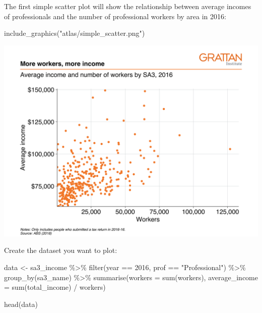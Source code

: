 \documentclass[
]{book}
\newenvironment{Shaded}{\begin{snugshade}}{\end{snugshade}}
\newcommand{\AttributeTok}[1]{\textcolor[rgb]{0.77,0.63,0.00}{#1}}
\newcommand{\DecValTok}[1]{\textcolor[rgb]{0.00,0.00,0.81}{#1}}
\newcommand{\FunctionTok}[1]{\textcolor[rgb]{0.00,0.00,0.00}{#1}}
\newcommand{\NormalTok}[1]{#1}
\newcommand{\OtherTok}[1]{\textcolor[rgb]{0.56,0.35,0.01}{#1}}
\newcommand{\SpecialCharTok}[1]{\textcolor[rgb]{0.00,0.00,0.00}{#1}}
\newcommand{\StringTok}[1]{\textcolor[rgb]{0.31,0.60,0.02}{#1}}
\begin{document}
The first simple scatter plot will show the relationship between average incomes of professionals and the number of professional workers by area in 2016:

\begin{Shaded}
\begin{Highlighting}[]
\FunctionTok{include\_graphics}\NormalTok{(}\StringTok{"atlas/simple\_scatter.png"}\NormalTok{)}
\end{Highlighting}
\end{Shaded}

\includegraphics{atlas/simple_scatter.png}

Create the dataset you want to plot:

\begin{Shaded}
\begin{Highlighting}[]
\NormalTok{data }\OtherTok{\textless{}{-}}\NormalTok{ sa3\_income }\SpecialCharTok{\%\textgreater{}\%} 
  \FunctionTok{filter}\NormalTok{(year }\SpecialCharTok{==} \DecValTok{2016}\NormalTok{,}
\NormalTok{         prof }\SpecialCharTok{==} \StringTok{"Professional"}\NormalTok{) }\SpecialCharTok{\%\textgreater{}\%} 
  \FunctionTok{group\_by}\NormalTok{(sa3\_name) }\SpecialCharTok{\%\textgreater{}\%} 
  \FunctionTok{summarise}\NormalTok{(}\AttributeTok{workers =} \FunctionTok{sum}\NormalTok{(workers),}
            \AttributeTok{average\_income =} \FunctionTok{sum}\NormalTok{(total\_income) }\SpecialCharTok{/}\NormalTok{ workers)}

\FunctionTok{head}\NormalTok{(data)}
\end{Highlighting}
\end{Shaded}
\end{document}
